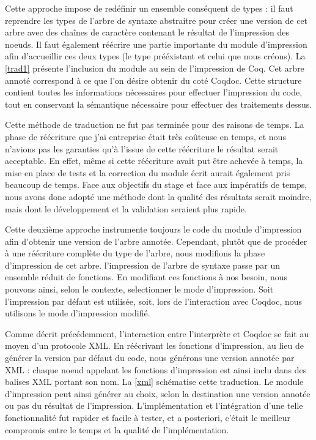 \documentclass[a4paper, 11pt]{report}
\begin{document}
    Cette approche impose de redéfinir un ensemble conséquent de types :
    il faut reprendre les types de l'arbre de syntaxe abstraitre pour créer
    une version de cet arbre avec des chaînes de caractère contenant le
    résultat de l'impression des noeuds. Il faut également réécrire une partie
    importante du module d'impression afin d'accueillir ces deux types (le type
    prééxistant et celui que nous créons). La \cref{trad1} présente
    l'inclusion du module au sein de l'impression de Coq. Cet arbre annoté
    correspond à ce que l'on désire obtenir du coté Coqdoc. Cette structure
    contient toutes les informations nécessaires pour effectuer l'impression
    du code, tout en conservant la sémantique nécessaire pour effectuer des
    traitements dessus.

    Cette méthode de traduction ne fut pas terminée pour des raisons de temps.
    La phase de réécriture que j'ai entreprise était très coûteuse en temps,
    et nous n'avions pas les garanties qu'à l'issue de cette réécriture le
    résultat serait acceptable. En effet, même si cette réécriture avait put
    être achevée à temps, la mise en place de tests et la correction du module
    écrit aurait également pris beaucoup de temps. Face aux objectifs du stage
    et face aux impératifs de temps, nous avons donc adopté une méthode dont
    la qualité des résultats serait moindre, mais dont le développement et la
    validation seraient plus rapide.

    Cette deuxième approche instrumente toujours le code du module d'impression
    afin d'obtenir une version de l'arbre annotée. Cependant, plutôt que de
    procéder à une réécriture complète du type de l'arbre, nous modifions la
    phase d'impression de cet arbre. l'impression de l'arbre de syntaxe passe
    par un ensemble réduit de fonctions. En modifiant ces fonctions à nos
    besoin, nous pouvons ainsi, selon le contexte, selectionner le mode
    d'impression. Soit l'impression par défaut est utilisée, soit, lors de
    l'interaction avec Coqdoc, nous utilisons le mode d'impression modifié.

    Comme décrit précédemment, l'interaction entre l'interprète et Coqdoc se
    fait au moyen d'un protocole XML. En réécrivant les fonctions d'impression,
    au lieu de générer la version par défaut du code, nous générons une version
    annotée par XML : chaque noeud appelant les fonctions d'impression est
    ainsi inclu dans des balises XML portant son nom. La \cref{xml} schématise
    cette traduction. Le module d'impression peut ainsi générer au choix,
    selon la destination une version annotée ou pas du résultat de
    l'impression. L'implémentation et l'intégration d'une telle fonctionnalité
    fut rapider et facile à tester, et a posteriori, c'était le meilleur compromis
    entre le temps et la qualité de l'implémentation.
    
    
    \clearpage
\end{document}
